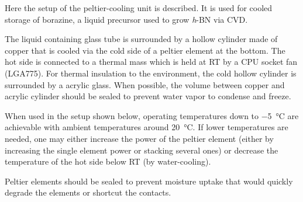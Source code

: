 \label{sec:borazine-cooler}
Here the setup of the peltier-cooling unit is described. It is used for cooled  storage of borazine, a liquid precursor used to grow \textit{h}-BN via CVD.

The liquid containing glass tube is surrounded by a hollow cylinder made of copper that is cooled via the cold side of a peltier element at the bottom. The hot side is connected to a thermal mass which is held at RT by a CPU socket fan (LGA775). For thermal insulation to the environment, the cold hollow cylinder is surrounded by a acrylic glass. When possible, the volume between copper and acrylic cylinder should be sealed to prevent water vapor to condense and freeze. 

When used in the setup shown below, operating temperatures down to \SI{-5}{\celsius} are achievable with ambient temperatures around \SI{20}{\celsius}. If lower temperatures are needed, one may either increase the power of the peltier element (either by increasing the single element power or stacking several ones) or decrease the temperature of the hot side below RT (by water-cooling).

Peltier elements should be sealed to prevent moisture uptake that would quickly degrade the elements or shortcut the contacts.